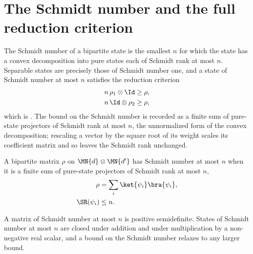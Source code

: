\section{The Schmidt number and the full reduction criterion}

The Schmidt number of a bipartite state is the smallest $n$ for which the state has
a convex decomposition into pure states each of Schmidt rank at most $n$. Separable
states are precisely those of Schmidt number one, and a state of Schmidt number at
most $n$ satisfies the reduction criterion
\begin{align}
    n\,\rho_1\otimes\Id & \ge\rho,
    \notag                         \\
    n\,\Id\otimes\rho_2 & \ge\rho,
    \notag
\end{align}
which is \cite[Equation~(3.18)]{Wolf2012Quantum}. The bound on the Schmidt number is
recorded as a finite sum of pure-state projectors of Schmidt rank at most $n$, the
unnormalized form of the convex decomposition; rescaling a vector by the square root
of its weight scales its coefficient matrix and so leaves the Schmidt rank unchanged.

\begin{definition}
    \label{def:has_schmidt_number_le}
    \leanok
    A bipartite matrix $\rho$ on $\MN{d}\otimes\MN{d'}$ has Schmidt number at most $n$
    when it is a finite sum of pure-state projectors of Schmidt rank at most $n$,
    \begin{align}
        \rho        & =\sum_i\ket{\psi_i}\bra{\psi_i},
        \notag                                         \\
        \SR(\psi_i) & \le n.
        \notag
    \end{align}
\end{definition}

\begin{theorem}
    \label{thm:has_schmidt_number_le_basic}
    \leanok
    A matrix of Schmidt number at most $n$ is positive semidefinite. States of
    Schmidt number at most $n$ are closed under addition and under multiplication by a
    non-negative real scalar, and a bound on the Schmidt number relaxes to any larger
    bound.
\end{theorem}

